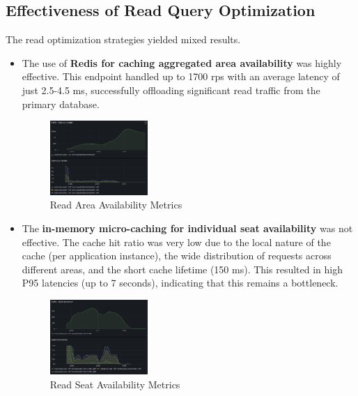 \subsection{Effectiveness of Read Query Optimization}
The read optimization strategies yielded mixed results.
\begin{itemize}
    \item The use of \textbf{Redis for caching aggregated area availability} was highly effective. This endpoint handled up to 1700 rps with an average latency of just 2.5-4.5 ms, successfully offloading significant read traffic from the primary database.
          \begin{figure}[h!]
              \centering
              \includegraphics[width=0.35\textwidth]{resources/chapter-4/latency-area-availability.png}
              \caption{Read Area Availability Metrics}
              \label{fig:latency-get-area}
          \end{figure}

    \item The \textbf{in-memory micro-caching for individual seat availability} was not effective. The cache hit ratio was very low due to the local nature of the cache (per application instance), the wide distribution of requests across different areas, and the short cache lifetime (150 ms). This resulted in high P95 latencies (up to 7 seconds), indicating that this remains a bottleneck.
          \begin{figure}[h!]
              \centering
              \includegraphics[width=0.35\textwidth]{resources/chapter-4/latency-seat-availability.png}
              \caption{Read Seat Availability Metrics}
              \label{fig:latency-get-seat}
          \end{figure}
\end{itemize}

